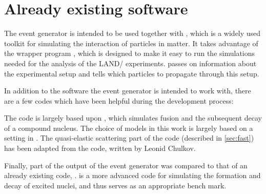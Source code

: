 %
\section{Already existing software}
\label{sec:exsoft}
The event generator is intended to be used together with , which is a widely used toolkit for simulating the interaction of particles in matter\cite{allison:2006:art}. It takes advantage of the wrapper program \cite{johansson:2013:online}, which is designed to make it easy to run the simulations needed for the analysis of the LAND/\rtb{} experiments.  passes on information about the experimental setup and tells  which particles to propagate through this setup.

In addition to the software the event generator is intended to work with, there are a few codes which have been helpful during the development process:

The code is largely based upon \cite{gollerthan:1988:thesis}, which simulates fusion and the subsequent decay of a compound nucleus. The choice of models in this work is largely based on a setting in .
The quasi-elastic scattering part of the code (described in \autoref{sec:fast}) has been adapted from the  code, written by Leonid Chulkov.

Finally, part of the output of the event generator was compared to that of an already existing code, \cite{talys:2015}.  is a more advanced code for simulating the formation and decay of excited nuclei, and thus serves as an appropriate bench mark. %